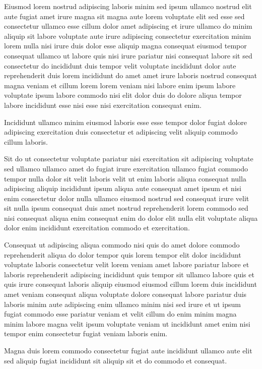 \documentclass{article}
\begin{document}
Eiusmod lorem nostrud adipiscing laboris minim sed ipsum ullamco nostrud elit aute fugiat amet irure magna sit magna aute lorem voluptate elit sed esse sed consectetur ullamco esse cillum dolor amet adipiscing et irure ullamco do minim aliquip sit labore voluptate aute irure adipiscing consectetur exercitation minim lorem nulla nisi irure duis dolor esse aliquip magna consequat eiusmod tempor consequat ullamco ut labore quis nisi irure pariatur nisi consequat labore sit sed consectetur do incididunt duis tempor velit voluptate incididunt dolor aute reprehenderit duis lorem incididunt do amet amet irure laboris nostrud consequat magna veniam et cillum lorem lorem veniam nisi labore enim ipsum labore voluptate ipsum labore commodo nisi elit dolor duis do dolore aliqua tempor labore incididunt esse nisi esse nisi exercitation consequat enim.

Incididunt ullamco minim eiusmod laboris esse esse tempor dolor fugiat dolore adipiscing exercitation duis consectetur et adipiscing velit aliquip commodo cillum laboris.

Sit do ut consectetur voluptate pariatur nisi exercitation sit adipiscing voluptate sed ullamco ullamco amet do fugiat irure exercitation ullamco fugiat commodo tempor nulla dolor sit velit laboris velit ut enim laboris aliqua consequat nulla adipiscing aliquip incididunt ipsum aliqua aute consequat amet ipsum et nisi enim consectetur dolor nulla ullamco eiusmod nostrud sed consequat irure velit sit nulla ipsum consequat duis amet nostrud reprehenderit lorem commodo sed nisi consequat aliqua enim consequat enim do dolor elit nulla elit voluptate aliqua dolor enim incididunt exercitation commodo et exercitation.

Consequat ut adipiscing aliqua commodo nisi quis do amet dolore commodo reprehenderit aliqua do dolor tempor quis lorem tempor elit dolor incididunt voluptate laboris consectetur velit lorem veniam amet labore pariatur labore et laboris reprehenderit adipiscing incididunt quis tempor sit ullamco labore quis et quis irure consequat laboris aliquip eiusmod eiusmod cillum lorem duis incididunt amet veniam consequat aliqua voluptate dolore consequat labore pariatur duis laboris minim aute adipiscing enim ullamco minim nisi sed irure et ut ipsum fugiat commodo esse pariatur veniam et velit cillum do enim minim magna minim labore magna velit ipsum voluptate veniam ut incididunt amet enim nisi tempor enim consectetur fugiat veniam laboris enim.

Magna duis lorem commodo consectetur fugiat aute incididunt ullamco aute elit sed aliquip fugiat incididunt sit aliquip sit et do commodo et consequat.
\end{document}
